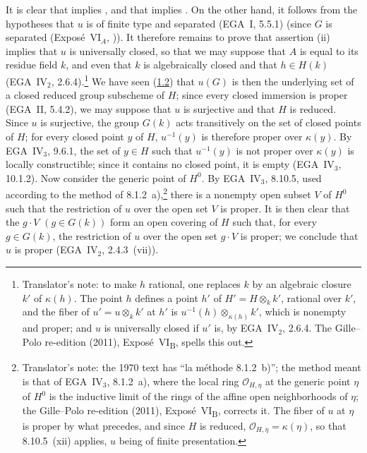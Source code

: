 It is clear that \textup{} implies \textup{}, and that
\textup{} implies \textup{}. On the other hand, it follows
from the hypotheses that \(u\) is of finite type and separated
(EGA~I, 5.5.1) (since \(G\) is separated (Expos\'e~VI\(_A\), )). It
therefore remains to prove that assertion \textup{(ii)} implies that \(u\)
is universally closed, so that we may suppose that \(A\) is equal to its
residue field \(k\), and even that \(k\) is algebraically closed and that
\(h\in H(k)\) (EGA~IV\(_2\), 2.6.4).\footnote{Translator's note: to make \(h\) rational, one
replaces \(k\) by an algebraic closure \(k'\) of \(\kappa(h)\). The point \(h\) defines a point \(h'\) of
\(H'=H\otimes_kk'\), rational over \(k'\), and the fiber of \(u'=u\otimes_kk'\) at \(h'\) is
\(u^{-1}(h)\otimes_{\kappa(h)}k'\), which is nonempty and proper; and \(u\) is universally closed if
\(u'\) is, by EGA~IV\(_2\), 2.6.4. The Gille--Polo re-edition (2011), Expos\'e~VI\textsubscript{B}, spells
this out.} We have seen (\hyperref[prop:sga3-VIB-1.2]{1.2}) that \(u(G)\)
is then the underlying set of a closed reduced group subscheme of \(H\);
since every closed immersion is proper (EGA~II, 5.4.2), we may suppose
that \(u\) is surjective and that \(H\) is reduced. Since \(u\) is
surjective, the group \(G(k)\) acts transitively on the set of closed
points of \(H\); for every closed point \(y\) of \(H\), \(u^{-1}(y)\) is
therefore proper over \(\kappa(y)\). By EGA~IV\(_3\), 9.6.1, the set of
\(y\in H\) such that \(u^{-1}(y)\) is not proper over \(\kappa(y)\) is
locally constructible; since it contains no closed point, it is empty
(EGA~IV\(_3\), 10.1.2). Now consider the generic point of \(H^0\). By
EGA~IV\(_3\), 8.10.5, used according to the method of 8.1.2~a),\footnote{Translator's note: the
1970 text has ``la méthode 8.1.2~b)''; the method meant is that of EGA~IV\(_3\), 8.1.2~a), where the
local ring \(\mathcal O_{H,\eta}\) at the generic point \(\eta\) of \(H^0\) is the inductive limit of the
rings of the affine open neighborhoods of \(\eta\); the Gille--Polo re-edition (2011),
Expos\'e~VI\textsubscript{B}, corrects it. The fiber of \(u\) at \(\eta\) is proper by what precedes, and
since \(H\) is reduced, \(\mathcal O_{H,\eta}=\kappa(\eta)\), so that 8.10.5~(xii) applies, \(u\) being of
finite presentation.} there is a
nonempty open subset \(V\) of \(H^0\) such that the restriction of \(u\)
over the open set \(V\) is proper. It is then clear that the
\(g\cdot V\) \((g\in G(k))\) form an open covering of \(H\) such that, for
every \(g\in G(k)\), the restriction of \(u\) over the open set
\(g\cdot V\) is proper; we conclude that \(u\) is proper
(EGA~IV\(_2\), 2.4.3~(vii)).

